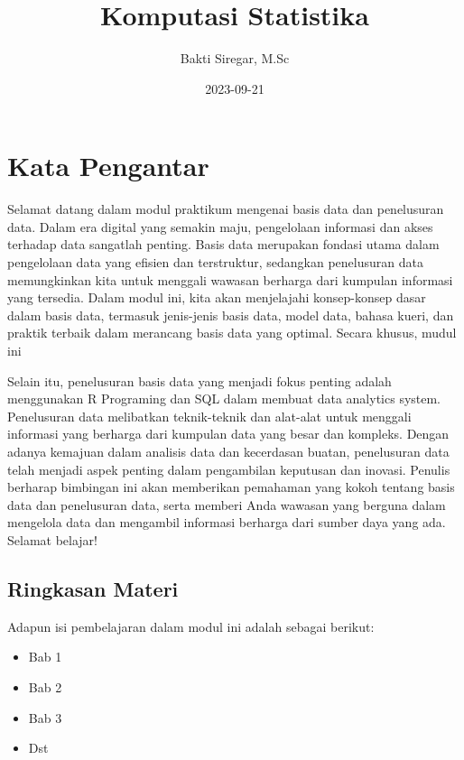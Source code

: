 \documentclass[
]{book}
\title{Komputasi Statistika}
\author{Bakti Siregar, M.Sc}
\date{2023-09-21}
\providecommand{\tightlist}{%
  \setlength{\itemsep}{0pt}\setlength{\parskip}{0pt}}
\begin{document}
\maketitle

{
\setcounter{tocdepth}{1}
\tableofcontents
}
\hypertarget{kata-pengantar}{%
\chapter*{Kata Pengantar}\label{kata-pengantar}}

Selamat datang dalam modul praktikum mengenai basis data dan penelusuran data. Dalam era digital yang semakin maju, pengelolaan informasi dan akses terhadap data sangatlah penting. Basis data merupakan fondasi utama dalam pengelolaan data yang efisien dan terstruktur, sedangkan penelusuran data memungkinkan kita untuk menggali wawasan berharga dari kumpulan informasi yang tersedia. Dalam modul ini, kita akan menjelajahi konsep-konsep dasar dalam basis data, termasuk jenis-jenis basis data, model data, bahasa kueri, dan praktik terbaik dalam merancang basis data yang optimal. Secara khusus, mudul ini

Selain itu, penelusuran basis data yang menjadi fokus penting adalah menggunakan R Programing dan SQL dalam membuat data analytics system. Penelusuran data melibatkan teknik-teknik dan alat-alat untuk menggali informasi yang berharga dari kumpulan data yang besar dan kompleks. Dengan adanya kemajuan dalam analisis data dan kecerdasan buatan, penelusuran data telah menjadi aspek penting dalam pengambilan keputusan dan inovasi. Penulis berharap bimbingan ini akan memberikan pemahaman yang kokoh tentang basis data dan penelusuran data, serta memberi Anda wawasan yang berguna dalam mengelola data dan mengambil informasi berharga dari sumber daya yang ada. Selamat belajar!

\hypertarget{ringkasan-materi}{%
\section*{Ringkasan Materi}\label{ringkasan-materi}}

Adapun isi pembelajaran dalam modul ini adalah sebagai berikut:

\begin{itemize}
\tightlist
\item
  Bab 1
\item
  Bab 2
\item
  Bab 3
\item
  Dst
\end{itemize}
\end{document}
